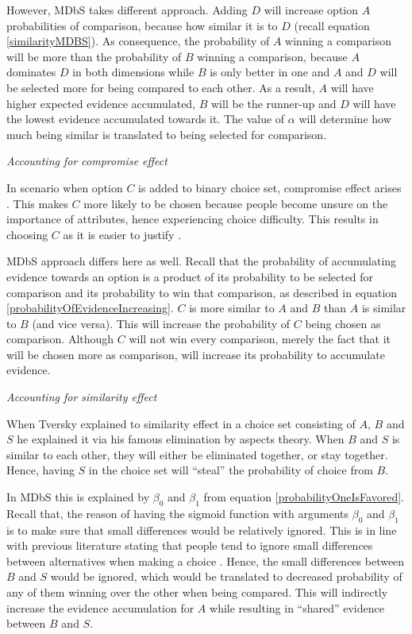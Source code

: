 \documentclass[a4paper,12pt]{article}
\newcommand{\citeyearonly}[1]{\citeyearpar{#1}}
\begin{document}
However, MDbS takes different approach. Adding $D$ will increase option $A$ probabilities of comparison, because how similar it is to $D$ (recall equation \ref{similarityMDBS}). As consequence, the probability of $A$ winning a comparison will be more than the probability of $B$ winning a comparison, because $A$ dominates $D$ in both dimensions while $B$ is only better in one and $A$ and $D$ will be selected more for being  compared to each other. As a result, $A$ will have higher expected evidence accumulated, $B$ will be the runner-up and $D$ will have the lowest evidence accumulated towards it. The value of $\alpha$ will determine how much being similar is translated to being selected for comparison.

\textit{Accounting for compromise effect}

In scenario when option $C$ is added to binary choice set, compromise effect arises \citep{simonson89}. This makes $C$ more likely to be chosen because people become unsure on the importance of attributes, hence experiencing choice difficulty. This results in choosing $C$ as it is easier to justify \citep{simonson89}. 

MDbS approach differs here as well. Recall that the probability of accumulating evidence towards an option is a product of its probability to be selected for comparison and its probability to win that comparison, as described in equation \ref{probabilityOfEvidenceIncreasing}. $C$ is more similar to $A$ and $B$ than $A$ is similar to $B$ (and vice versa). This will increase the probability of $C$ being chosen as comparison. Although $C$ will not win every comparison, merely the fact that it will be chosen more as comparison, will increase its probability to accumulate evidence.

\textit{Accounting for similarity effect}

When Tversky \citeyearonly{tversky1972elimination} explained to similarity effect in a choice set consisting of $A$, $B$ and $S$ he explained it via his famous elimination by aspects theory. When $B$ and $S$ is similar to each other, they will either be eliminated together, or stay together. Hence, having $S$ in the choice set will ``steal'' the probability of choice from $B$.

In MDbS this is explained by $\beta_0$ and $\beta_1$ from equation \ref{probabilityOneIsFavored}. Recall that, the reason of having the sigmoid function with arguments $\beta_0$ and $\beta_1$ is to make sure that small differences would be relatively ignored. This is in line with previous literature stating that people tend to ignore small differences between alternatives when making a choice \citep{kalwani1992consumer}. Hence, the small differences between $B$ and $S$ would be ignored, which would be translated to decreased probability of any of them winning over the other when being compared. This will indirectly increase the evidence accumulation for $A$ while resulting in ``shared'' evidence between $B$ and $S$.
\end{document}
